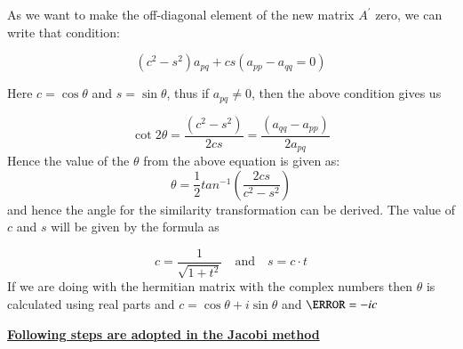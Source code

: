 \documentclass[journal]{IEEEtran}
\begin{document}
As we want to make the off-diagonal element of the new matrix $A^{\prime}$ zero, we can write that condition:

\begin{equation*}
    (c^2 - s^2) a_{pq} + cs (a_{pp} - a_{qq} = 0)
\end{equation*}

Here $c = \cos \theta$ and $s = \sin \theta$, thus if $a_{pq} \neq 0$, then the above condition gives us

\begin{equation*}
     \cot 2\theta = \frac{(c^2 - s^2)}{2cs} = \frac{(a_{qq} - a_{pp})}{2a_{pq}}
\end{equation*}
Hence the value of the $\theta$ from the above equation is given as:
\begin{equation*}
     \theta = \frac{1}{2}tan^{-1}(\frac{2cs}{c^{2}-s^{2}})
\end{equation*}
and hence the angle for the similarity transformation can be derived. The value of $c$ and $s$ will be given by the formula as

\begin{equation*}
    c = \frac{1}{\sqrt{1 + t^2}} \quad \text{and} \quad s = c \cdot t
\end{equation*}
If we are doing with the hermitian matrix with the complex numbers then $\theta$ is calculated using real parts and $c=\cos\theta+i\sin\theta$ and $\s=-ic$

\underline{\textbf{Following steps are adopted in the Jacobi method}}
\end{document}
